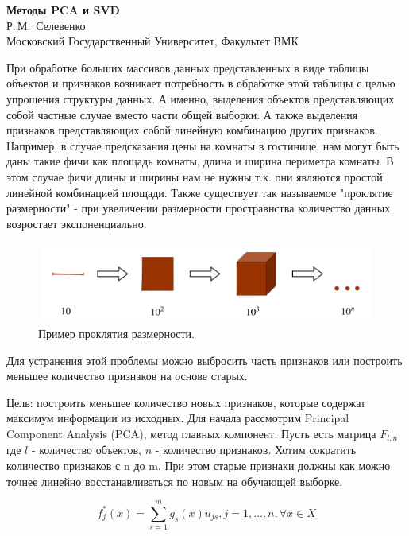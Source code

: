 \documentclass[12pt,a4paper]{article}
\begin{document}
\renewcommand\refname{\centering \textit{\small{Литература}}}

\begin{center}
{\large\bf Методы PCA и SVD} \\[5mm] Р.\,М.~Селевенко \\
 Московский Государственный Университет, Факультет ВМК\\
\end{center}

При обработке больших массивов данных представленных в виде таблицы объектов и признаков  возникает потребность в обработке этой таблицы с целью упрощения структуры данных.
А именно, выделения объектов представляющих собой частные случае вместо части общей выборки. А также выделения признаков представляющих собой линейную комбинацию других признаков. 
Например, в случае предсказания цены на комнаты в гостинице, нам могут быть даны такие фичи как площадь комнаты, длина и ширина периметра комнаты.
В этом случае фичи длины и ширины нам не нужны т.к. они являются простой линейной комбинацией площади. 
Также существует так называемое "проклятие размерности" - при увеличении размерности простравнства количество данных возростает экспоненциально.

\begin{figure}[h]
\includegraphics[scale=0.75, width = 480, height = 100]{dimension.jpg}
\caption{Пример проклятия размерности.}
\label{ris:image}
\end{figure}

Для устранения этой проблемы можно выбросить часть признаков или построить меньшее количество признаков на основе старых.

Цель: построить	меньшее количество новых признаков, которые содержат максимум информации из исходных.
Для начала рассмотрим Principal Component Analysis (PCA), метод главных компонент.
Пусть есть матрица $F_{l,n}$ где $l$ - количество объектов, $n$ - количество признаков.
Хотим сократить количество признаков с n до m. 
При этом старые признаки должны как можно точнее линейно восстанавливаться по новым на обучающей выборке.

$$
    f_j^{*}(x) = \sum_{s=1}^{m}g_s(x)u_{js}, j=1, \ldots, n, \forall x \in X
$$
\end{document}
